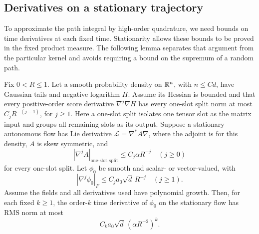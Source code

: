 \subsection{Derivatives on a stationary trajectory}

To approximate the path integral by high-order quadrature, we need
bounds on time derivatives at each fixed time.  Stationarity allows
these bounds to be proved in the fixed product measure.  The following
lemma separates that argument from the particular kernel and avoids
requiring a bound on the supremum of a random path.

\begin{lemma}\label{lem:stationary-derivatives}
Fix $0<R\le1$.  Let a smooth probability density on $\mathbb R^n$, with
$n\le Cd$, have Gaussian tails and negative logarithm $H$.  Assume
its Hessian is bounded and that every positive-order score derivative
$\nabla^j\nabla H$ has every one-slot split norm at most
$C_jR^{-(j-1)}$, for $j\ge1$.  Here a one-slot split isolates one
tensor slot as the matrix input and groups all remaining slots as
its output.  Suppose a stationary autonomous flow has Lie derivative
$\mathcal L=\nabla^*A\nabla$, where the adjoint is for this density,
$A$ is skew symmetric, and
\[
 |\nabla^jA|_{\text{one-slot split}}\le C_j\alpha R^{-j}
 \quad(j\ge0)
\]
for every one-slot split.  Let $\phi_0$ be smooth and scalar- or
vector-valued, with
\[
 |\nabla^j\phi_0|_F\le C_ja_0\sqrt d\,R^{-j}
 \quad(j\ge1).
\]
Assume the fields and all derivatives used have polynomial growth.
Then, for each fixed $k\ge1$, the order-$k$ time derivative of
$\phi_0$ on the stationary flow has RMS norm at most
\begin{equation}\label{eq:stationary-derivatives}
 C_k a_0\sqrt d\,(\alpha R^{-2})^k.
\end{equation}
\end{lemma}


